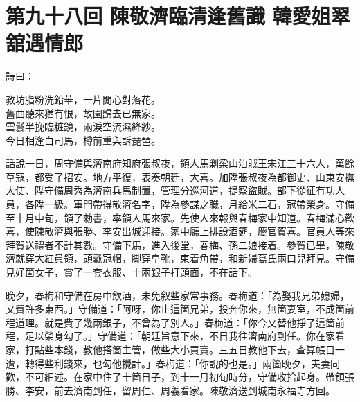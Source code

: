 
\chapter*{第九十八回 陳敬濟臨清逢舊識 韓愛姐翠舘遇情郎}


詩曰：

\begin{myquote}
教坊脂粉洗鉛華，一片閒心對落花。\\舊曲聽來猶有恨，故園歸去已無家。\\雲鬟半挽臨粧鏡，兩淚空流濕絳紗。\\今日相逢白司馬，樽前重與訴琵琶。
\end{myquote}

話說一日，周守備與濟南府知府張叔夜，領人馬剿梁山泊賊王宋江三十六人，萬餘草寇，都受了招安。地方平復，表奏朝廷，大喜。加陞張叔夜為都御史、山東安撫大使、陞守備周秀為濟南兵馬制置，管理分巡河道，提察盜賊。部下從征有功人員，各陞一級。軍門帶得敬濟名字，陞為參謀之職，月給米二石，冠帶榮身。守備至十月中旬，領了勑書，率領人馬來家。先使人來報與春梅家中知道。春梅滿心歡喜，使陳敬濟與張勝、李安出城迎接。家中廳上排設酒筵，慶官賀喜。官員人等來拜賀送禮者不計其數。守備下馬，進入後堂，春梅、孫二娘接着。參賀已畢，陳敬濟就穿大紅員領，頭戴冠帽，脚穿皁靴，束着角帶，和新婦葛氏兩口兒拜見。{}守備見好箇女子，賞了一套衣服、十兩銀子打頭面，不在話下。

晚夕，春梅和守備在房中飲酒，未免叙些家常事務。春梅道：「為娶我兄弟媳婦，又費許多東西。」守備道：「阿呀，你止這箇兄弟，投奔你來，無箇妻室，不成箇前程道理。就是費了幾兩銀子，不曾為了別人。」春梅道：「你今又替他掙了這箇前程，足以榮身勾了。」守備道：「朝廷旨意下來，不日我往濟南府到任。你在家看家，打點些本錢，教他搭箇主管，做些大小買賣。三五日教他下去，查算帳目一遭，轉得些利錢來，也勾他攪計。」{}春梅道：「你說的也是。」兩箇晚夕，夫妻同歡，不可細述。在家中住了十箇日子，到十一月初旬時分，守備收拾起身。帶領張勝、李安，前去濟南到任，留周仁、周義看家。陳敬濟送到城南永福寺方回。

